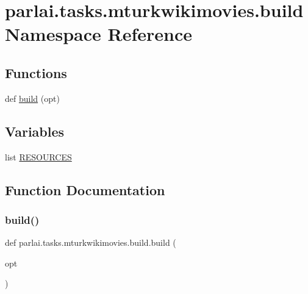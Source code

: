 \hypertarget{namespaceparlai_1_1tasks_1_1mturkwikimovies_1_1build}{}\section{parlai.\+tasks.\+mturkwikimovies.\+build Namespace Reference}
\label{namespaceparlai_1_1tasks_1_1mturkwikimovies_1_1build}
\subsection*{Functions}
\begin{DoxyCompactItemize}
\item 
def \hyperlink{namespaceparlai_1_1tasks_1_1mturkwikimovies_1_1build_aa6711f21fb369b452d25f98897f305d7}{build} (opt)
\end{DoxyCompactItemize}
\subsection*{Variables}
\begin{DoxyCompactItemize}
\item 
list \hyperlink{namespaceparlai_1_1tasks_1_1mturkwikimovies_1_1build_a701dd8bdee4e94953caf63360f50137b}{R\+E\+S\+O\+U\+R\+C\+ES}
\end{DoxyCompactItemize}


\subsection{Function Documentation}
\mbox{\label{namespaceparlai_1_1tasks_1_1mturkwikimovies_1_1build_aa6711f21fb369b452d25f98897f305d7}} 
\subsubsection{\texorpdfstring{build()}{build()}}
{\footnotesize\ttfamily def parlai.\+tasks.\+mturkwikimovies.\+build.\+build (\begin{DoxyParamCaption}\item[{}]{opt }\end{DoxyParamCaption})}



